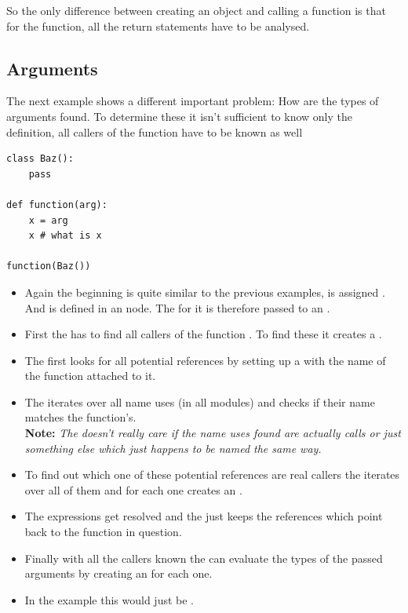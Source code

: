 \documentclass[12pt,halfparskip,DIV11,BCOR10mm]{scrreprt}
\begin{document}
So the only difference between creating an object and calling a function is that for the function, all the return statements have to be analysed.

\subsection{Arguments}

The next example shows a different important problem: How are the types of arguments found. To determine these it isn't sufficient to know only the definition, all callers of the function have to be known as well

\begin{lstlisting}
class Baz():
    pass

def function(arg):
    x = arg
    x # what is x
    
function(Baz())
\end{lstlisting}

\begin{itemize}
    \item Again the beginning is quite similar to the previous examples,  is assigned . And  is defined in an  node. The  for it is therefore passed to an .
    \item First the  has to find all callers of the function . To find these it creates a .
    \item The  first looks for all potential references by setting up a  with the name of the function attached to it.
    \item The  iterates over all name uses (in all modules) and checks if their name matches the function's. \textbf{} \\\textbf{Note:} \emph{The  doesn't really care if the name uses found are actually calls or just something else which just happens to be named the same way.}
    \item To find out which one of these potential references are real callers the  iterates over all of them and for each one creates an .
    \item The expressions get resolved and the  just keeps the references which point back to the function in question.
    \item Finally with all the callers known the  can evaluate the types of the passed arguments by creating an  for each one.
    \item[] In the example this would just be .
\end{itemize}
\end{document}
